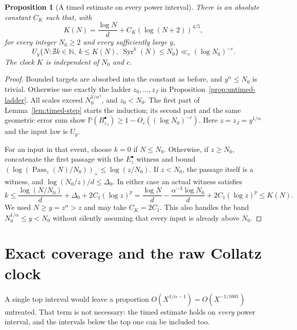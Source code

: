 \documentclass[11pt]{article}
\newtheorem{proposition}{Proposition}
\theoremstyle{remark}\newtheorem{remark}[proposition]{Remark}
\newcommand{\PP}{\mathbb P}
\newcommand{\NN}{\mathbb N}
\newcommand{\Syr}{\operatorname{Syr}}
\begin{document}
\begin{proposition}[A timed estimate on every power interval]
\label{prop:timed-block}
There is an absolute constant $C_K$ such that, with
\[
 K(N)=\frac{\log N}{d}+C_K(\log(N+2))^{4/5},
\]
for every integer $N_0\ge2$ and every sufficiently large $y$,
\[
 U_y\{N:\nexists k\in\NN,\ k\le K(N),\ \Syr^k(N)\le N_0\}
                   \ll_c(\log N_0)^{-c}.
\]
The clock $K$ is independent of $N_0$ and $c$.
\end{proposition}
\begin{proof}
Bounded targets are absorbed into the constant as before, and
$y^\alpha\le N_0$ is trivial. Otherwise use exactly the ladder
$z_0,\ldots,z_J$ in Proposition~\ref{prop:untimed-ladder}.
All scales exceed $N_0^{1/\alpha^3}$, and $z_0<N_0$.
The first part of Lemma~\ref{lem:timed-step} starts the induction;
its second part and the same geometric error sum show
$\PP(B_{z_J}^\bullet)\ge1-O_c((\log N_0)^{-c})$.
Here $z=z_J=y^{1/\alpha}$ and the input law is $U_y$.

For an input in that event, choose $k=0$ if $N\le N_0$.
Otherwise, if $z\ge N_0$, concatenate the first passage with the
$E_z^\bullet$ witness and bound
$(\log(\operatorname{Pass}_z(N)/N_0))_+\le\log(z/N_0)$.
If $z<N_0$, the passage itself is a witness, and
$\log(N_0/z)/d\le\Delta_0$. In either case an actual witness satisfies
\[
 k\le\frac{\log(N/N_0)}d+\Delta_0+2C_1(\log z)^p
   =\frac{\log N}d-\frac{\alpha^{-3}\log N_0}d
                              +2C_1(\log z)^p
   \le K(N).
\]
We used $N\ge y=z^\alpha>z$ and may take $C_K=2C_1$.
This also handles the band $N_0^{1/\alpha}\le y<N_0$ without
silently assuming that every input is already above $N_0$.
\end{proof}

\section{Exact coverage and the raw Collatz clock}

A single top interval would leave a proportion
$O(X^{1/\alpha-1})=O(X^{-1/1001})$ untreated. That term is not
necessary: the timed estimate holds on \emph{every} power interval,
and the intervals below the top one can be included too.
\end{document}
